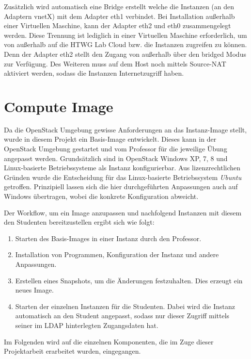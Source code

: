 Zusätzlich wird automatisch eine Bridge erstellt welche die Instanzen (an den Adaptern vnetX) mit dem Adapter eth1 verbindet.
Bei Installation außerhalb einer Virtuellen Maschine, kann der Adapter eth2 und eth0 zusammengelegt werden. 
Diese Trennung ist lediglich in einer Virtuellen Maschine erforderlich, um von außerhalb auf die HTWG Lab Cloud bzw. die Instanzen zugreifen zu können.
Denn der Adapter eth2 stellt den Zugang von außerhalb über den bridged Modus zur Verfügung.
Des Weiteren muss auf dem Host noch mittels  Source-NAT aktiviert werden, sodass die Instanzen Internetzugriff haben.

\section{Compute Image}

Da die OpenStack Umgebung gewisse Anforderungen an das Instanz-Image stellt, wurde in diesem Projekt ein Basis-Image entwickelt. 
Dieses kann in der OpenStack Umgebung gestartet und vom Professor für die jeweilige Übung angepasst werden.
Grundsätzlich sind in OpenStack Windows XP, 7, 8 und Linux-basierte Betriebssysteme als Instanz konfigurierbar. 
Aus lizenzrechtlichen Gründen wurde die Entscheidung für das Linux-basierte Betriebssystem \emph{Ubuntu} getroffen. 
Prinzipiell lassen sich die hier durchgeführten Anpassungen auch auf Windows übertragen, wobei die konkrete Konfiguration abweicht.

Der Workflow, um ein Image anzupassen und nachfolgend Instanzen mit diesem den Studenten bereitzustellen ergibt sich wie folgt:

\begin{enumerate}
\item Starten des Basis-Images in einer Instanz durch den Professor.
\item Installation von Programmen, Konfiguration der Instanz und andere Anpassungen.
\item Erstellen eines Snapshots, um die Änderungen festzuhalten. Dies erzeugt ein neues Image.
\item Starten der einzelnen Instanzen für die Studenten. Dabei wird die Instanz automatisch an den Student angepasst, sodass nur dieser Zugriff mittels seiner im LDAP hinterlegten Zugangsdaten hat.
\end{enumerate}

Im Folgenden wird auf die einzelnen Komponenten, die im Zuge dieser Projektarbeit erarbeitet wurden, eingegangen. 

